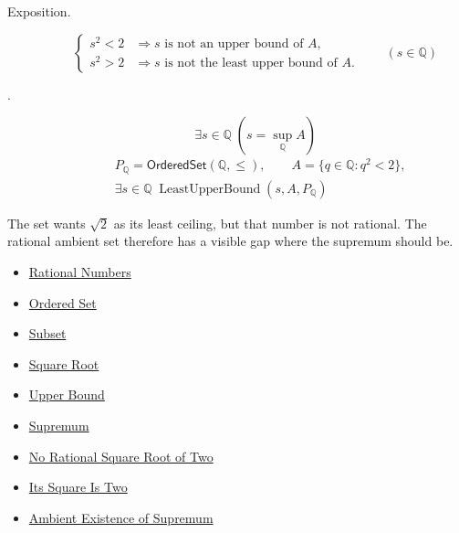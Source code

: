 \begin{remark*}
\begin{description}
  \item[Exposition.]
\[
\begin{cases}
s^2<2 &\Longrightarrow s\text{ is not an upper bound of }A,\\
s^2>2 &\Longrightarrow s\text{ is not the least upper bound of }A.
\end{cases}
\qquad(s\in\mathbb{Q})
\]


  \item[.]
  \[
\exists s\in\mathbb{Q}\;(s=\sup_{\mathbb{Q}}A)
\]
\[
\begin{aligned}
&P_{\mathbb{Q}}=\mathsf{OrderedSet}(\mathbb{Q},\leq),\qquad
A=\{q\in\mathbb{Q}:q^2<2\},\\
&\exists s\in\mathbb{Q}\;\operatorname{LeastUpperBound}(s,A,P_{\mathbb{Q}})
\end{aligned}
\]
\end{description}
\end{remark*}

\begin{remark*}[Interpretation]
The set wants $\sqrt{2}$ as its least ceiling, but that number is not rational. The rational ambient set therefore has a visible gap where the supremum should be.
\end{remark*}

\begin{dependencies}
\begin{itemize}
  \item \hyperref[def:rationals]{Rational Numbers}
  \item \hyperref[def:ordered-set]{Ordered Set}
  \item \hyperref[def:subset]{Subset}
  \item \hyperref[def:square-root]{Square Root}
  \item \hyperref[def:real-upper-bound]{Upper Bound}
  \item \hyperref[def:supremum]{Supremum}
  \item \hyperref[thm:no-rational-square-root-of-two]{No Rational Square Root of Two}
  \item \hyperref[thm:sqrt-two-squared-is-two]{Its Square Is Two}
  \item \hyperref[thm:ambient-existence-supremum]{Ambient Existence of Supremum}
\end{itemize}
\end{dependencies}






